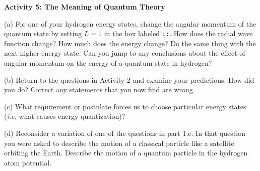 \textbf{Activity 5: The Meaning of Quantum Theory}

(a) For one of your hydrogen energy states, change the angular momentum of the
quantum state by setting $L=1$ in the box labeled {\tt L:}.
How does the radial wave function change?
How much does the energy change?
Do the same thing with the next higher energy state.
Can you jump to any conclusions about the effect of angular momentum on the energy
of a quantum state in hydrogen?
\vspace{2.0cm}

(b) Return to the questions in Activity 2 and examine your predictions.
How did you do?
Correct any statements that you now find are wrong.
\vspace{2.0cm}

(c) What requirement or postulate forces us to choose particular energy states
({\it i.e.} what causes energy quantization)?
\vspace{2.0cm}

(d) Reconsider a variation of one of the questions in part 1.c.
In that question you were asked to describe the motion of a classical particle
like a satellite orbiting the Earth.
Describe the motion of a quantum particle in the hydrogen atom potential.
